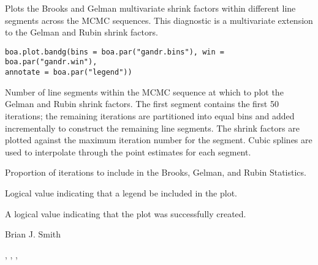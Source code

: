 \begin{Description}\relax
Plots the Brooks and Gelman multivariate shrink factors within different line 
segments across the MCMC sequences. This diagnostic is a multivariate 
extension to the Gelman and Rubin shrink factors.
\end{Description}
\begin{Usage}
\begin{verbatim}
boa.plot.bandg(bins = boa.par("gandr.bins"), win = boa.par("gandr.win"),
annotate = boa.par("legend"))
\end{verbatim}
\end{Usage}
\begin{Arguments}
\begin{ldescription}
\item[\code{bins}] Number of line segments within the MCMC sequence at which to plot 
the Gelman and Rubin shrink factors. The first segment contains the first 50 
iterations; the remaining iterations are partitioned into equal bins and added 
incrementally to construct the remaining line segments. The shrink factors are 
plotted against the maximum iteration number for the segment. Cubic splines 
are used to interpolate through the point estimates for each segment.
\item[\code{win}] Proportion of iterations to include in the Brooks, Gelman, and 
Rubin Statistics.
\item[\code{annotate}] Logical value indicating that a legend be included in the plot.
\end{ldescription}
\end{Arguments}
\begin{Value}
A logical value indicating that the plot was successfully created.
\end{Value}
\begin{Author}\relax
Brian J. Smith
\end{Author}
\begin{SeeAlso}\relax
{}, ,
, 
\end{SeeAlso}

